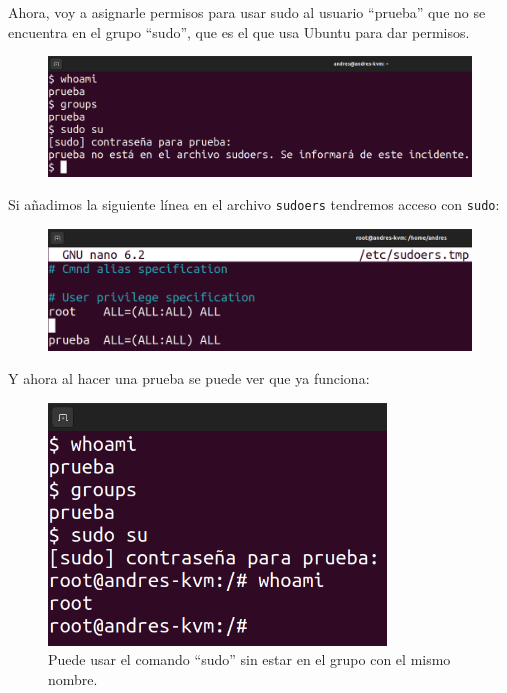 \documentclass{article}
\begin{document}
\bigskip

Ahora, voy a asignarle permisos para usar sudo al usuario ``prueba'' que no se encuentra en el grupo ``sudo'', que es el que usa Ubuntu para dar permisos.

\begin{figure}[H]
    \includegraphics[width=\textwidth]{imagenes/sudoprueba.png}
\end{figure}

\bigskip

Si añadimos la siguiente línea en el archivo \verb|sudoers| tendremos acceso con \verb|sudo|:

\begin{figure}[H]
    \includegraphics[width=\textwidth]{imagenes/sudoersprueba.png}
\end{figure}


Y ahora al hacer una prueba se puede ver que ya funciona:

\begin{figure}[H]
    \centering
    \includegraphics[width=0.8\textwidth]{imagenes/sudopruebaok.png}
    \caption{Puede usar el comando ``sudo'' sin estar en el grupo con el mismo nombre.}
\end{figure}
\end{document}
